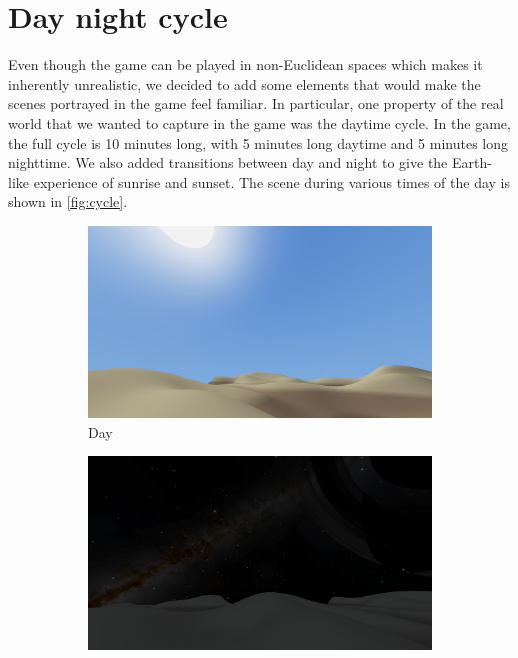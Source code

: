 \section{Day night cycle}
Even though the game can be played in non-Euclidean spaces which makes it inherently unrealistic, we decided to add some elements that would make the scenes portrayed in the game feel familiar.
In particular, one property of the real world that we wanted to capture in the game was the daytime cycle.
In the game, the full cycle is 10 minutes long, with 5 minutes long daytime and 5 minutes long nighttime.
We also added transitions between day and night to give the Earth-like experience of sunrise and sunset.
The scene during various times of the day is shown in \autoref{fig:cycle}.

\begin{figure}[h]
    \centering
    \begin{subfigure}[b]{0.475\textwidth}
        \centering
        \includegraphics[width=\textwidth]{chapters/theoretical_foundations/sections/day_night_cycle/resources/day.png}
        \caption[]%
        {{\small Day}}
        \label{fig:cycle-day}
    \end{subfigure}
    \hfill
    \begin{subfigure}[b]{0.475\textwidth}
        \centering
        \includegraphics[width=\textwidth]{chapters/theoretical_foundations/sections/day_night_cycle/resources/night.png}

\end{subfigure}
\end{figure}
